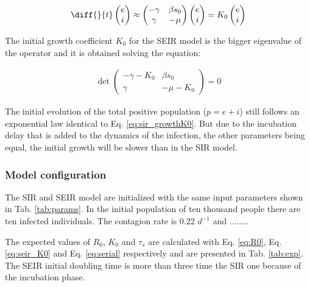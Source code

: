 \documentclass[DIV=12, BCOR=0pt]{scrartcl}  %
\begin{document}
  \begin{align}
  	\diff{}{t}
  	\begin{pmatrix}
  			e \\
  			i
  	\end{pmatrix}
  	\approx 
  	\begin{pmatrix}
  		 - \gamma & \beta s_0\\
  		 \gamma & - \mu
  	\end{pmatrix}
  	\begin{pmatrix}
  		e \\
  		i
  	\end{pmatrix}
	  = K_0 %
	  \begin{pmatrix}
	  	e \\
	  	i
	  \end{pmatrix} %
		\label{eq:seir_approxi}
	\end{align}

The initial growth coefficient $K_0$ for the SEIR model is the bigger eigenvalue of the operator and it is obtained solving the equation: 

	\begin{align}
		\det 
		\begin{pmatrix}
			- \gamma - K_0 & \beta s_0\\ %
			\gamma & - \mu - K_0  %
		\end{pmatrix} = 0
	\label{eq:seir_K0}
	\end{align}
 
 The initial evolution of the total positive population ($p = e + i$) still follows an exponential law identical to Eq. \ref{eq:sir_growthK0}. But due to the incubation delay that is added to the dynamics of the infection, the other parameters being equal, the initial growth will be slower than in the SIR model.
 
	
  \subsubsection{Model configuration}
  The SIR and SEIR model are initialized with the same input parameters shown in Tab. \ref{tab:params}. In the initial population of ten thousand people there are ten infected individuals. The contagion rate is 0.22 $d^{-1}$ and ........
 
  

  The expected values of $R_0$, $K_0$ and $\tau_s$ are calculated with Eq. \ref{eq:R0}, Eq. \ref{eq:seir_K0} and Eq. \ref{eq:serial} respectively and are presented in Tab. \ref{tab:exp}. The SEIR initial doubling time is more than three time the SIR one because of the incubation phase.
\end{document}
